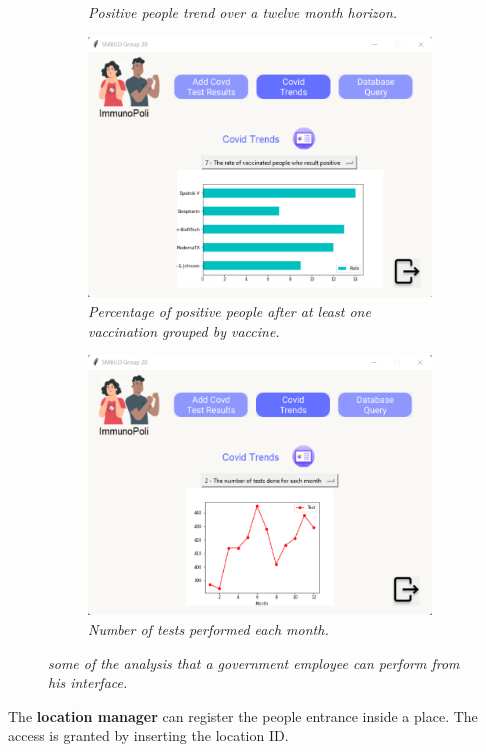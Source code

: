 \begin{figure}[h]
\begin{subfigure}{.5\textwidth}
  \caption{\textit{Positive people trend over a twelve month horizon.}}
  \label{fig:positive_trend}
\end{subfigure}
\begin{subfigure}{.5\textwidth}
  \centering
  \includegraphics[width=\linewidth]{images/application_screenshots/rate_positive_vaccinated.png}  
  \caption{\textit{Percentage of positive people after at least one vaccination grouped by vaccine.}}
  \label{fig:positive_vaccinated}
\end{subfigure}
\begin{subfigure}{.5\textwidth}
  \centering
  \includegraphics[width=\linewidth]{images/application_screenshots/test_trends.png}  
  \caption{\textit{Number of tests performed each month.}}
  \label{fig:test_trends}
\end{subfigure}
\caption{\textit{some of the analysis that a government employee can perform from his interface.}}
\label{fig:trends}
\end{figure}
\newpage
\noindent
The \textbf{location manager} can register the people entrance inside a place. The access is granted by inserting the location ID.

